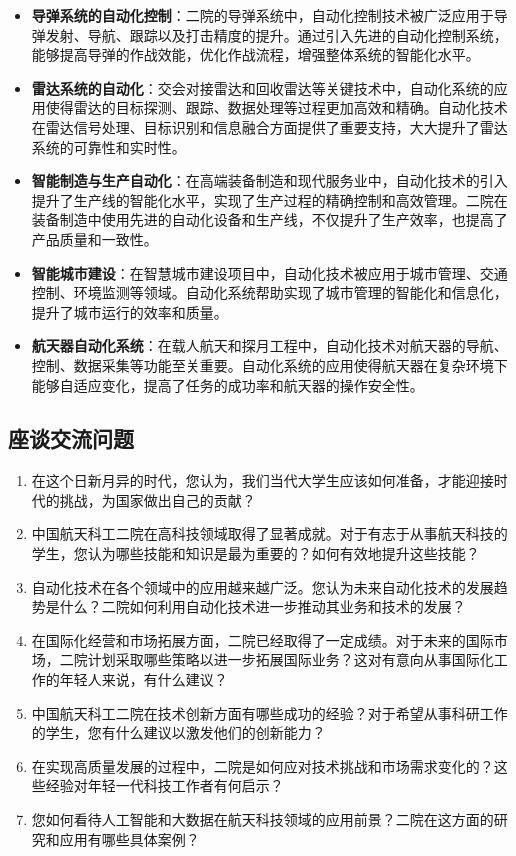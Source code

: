 \documentclass[12pt, a4paper, oneside]{ctexart}
\begin{document}
\begin{itemize}
    \item \textbf{导弹系统的自动化控制}：二院的导弹系统中，自动化控制技术被广泛应用于导弹发射、导航、跟踪以及打击精度的提升。通过引入先进的自动化控制系统，能够提高导弹的作战效能，优化作战流程，增强整体系统的智能化水平。
    \item \textbf{雷达系统的自动化}：交会对接雷达和回收雷达等关键技术中，自动化系统的应用使得雷达的目标探测、跟踪、数据处理等过程更加高效和精确。自动化技术在雷达信号处理、目标识别和信息融合方面提供了重要支持，大大提升了雷达系统的可靠性和实时性。
    \item \textbf{智能制造与生产自动化}：在高端装备制造和现代服务业中，自动化技术的引入提升了生产线的智能化水平，实现了生产过程的精确控制和高效管理。二院在装备制造中使用先进的自动化设备和生产线，不仅提升了生产效率，也提高了产品质量和一致性。
    \item \textbf{智能城市建设}：在智慧城市建设项目中，自动化技术被应用于城市管理、交通控制、环境监测等领域。自动化系统帮助实现了城市管理的智能化和信息化，提升了城市运行的效率和质量。
    \item \textbf{航天器自动化系统}：在载人航天和探月工程中，自动化技术对航天器的导航、控制、数据采集等功能至关重要。自动化系统的应用使得航天器在复杂环境下能够自适应变化，提高了任务的成功率和航天器的操作安全性。
\end{itemize}

\subsection{座谈交流问题}

\begin{enumerate}
    \item 在这个日新月异的时代，您认为，我们当代大学生应该如何准备，才能迎接时代的挑战，为国家做出自己的贡献？
    \item 中国航天科工二院在高科技领域取得了显著成就。对于有志于从事航天科技的学生，您认为哪些技能和知识是最为重要的？如何有效地提升这些技能？
    \item 自动化技术在各个领域中的应用越来越广泛。您认为未来自动化技术的发展趋势是什么？二院如何利用自动化技术进一步推动其业务和技术的发展？
    \item 在国际化经营和市场拓展方面，二院已经取得了一定成绩。对于未来的国际市场，二院计划采取哪些策略以进一步拓展国际业务？这对有意向从事国际化工作的年轻人来说，有什么建议？
    \item 中国航天科工二院在技术创新方面有哪些成功的经验？对于希望从事科研工作的学生，您有什么建议以激发他们的创新能力？
    \item 在实现高质量发展的过程中，二院是如何应对技术挑战和市场需求变化的？这些经验对年轻一代科技工作者有何启示？
    \item 您如何看待人工智能和大数据在航天科技领域的应用前景？二院在这方面的研究和应用有哪些具体案例？
\end{enumerate}
\end{document}
